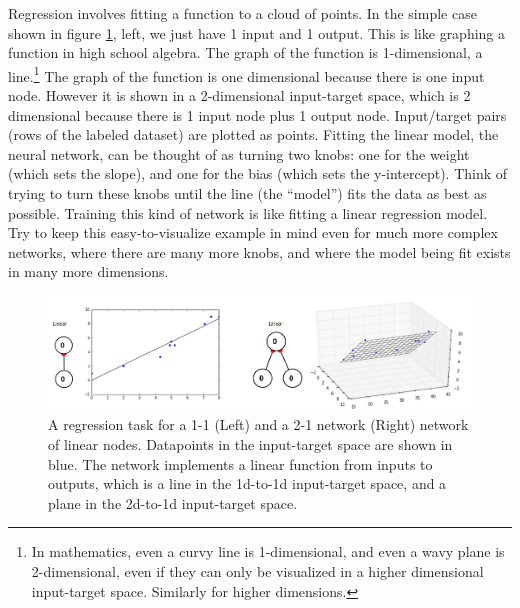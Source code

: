 Regression involves fitting a function to a cloud of points. In the simple case shown in figure \ref{visualize_regression}, left,  we just have 1 input and 1 output. This is like graphing a function in high school algebra. The graph of the function is 1-dimensional, \ie a line.\footnote{In mathematics, even a curvy line is 1-dimensional, and even a wavy plane is 2-dimensional, even if they can only be visualized in a higher dimensional input-target space. Similarly for higher dimensions.} The graph of the function is one dimensional because there is one input node. However it is shown in a 2-dimensional  input-target space, which is 2 dimensional because there is 1 input node plus 1 output  node. Input/target pairs (\ie rows of the labeled dataset) are plotted as points. Fitting the linear model, the neural network, can be thought of as turning two knobs: one for the weight (which sets the slope), and one for the bias (which sets the y-intercept). Think of trying to turn these knobs until the line (the ``model'') fits the data as best as possible. Training this kind of network is like fitting a linear regression model. Try to keep this easy-to-visualize example in mind even for much more complex networks, where there are many more knobs, and where the model being fit exists in many more dimensions.

\begin{figure}[h]
\centering
\includegraphics[scale=.4]{./images/visualizeRegression.png}
\caption[Jeff Yoshimi.]{A regression task for a 1-1 (Left) and a 2-1 network (Right) network of linear nodes. Datapoints in the input-target space are shown in  blue. The network implements a linear function from inputs to outputs, which is a line in the 1d-to-1d input-target space, and a plane in the 2d-to-1d input-target space. }
\label{visualize_regression}
\end{figure}

